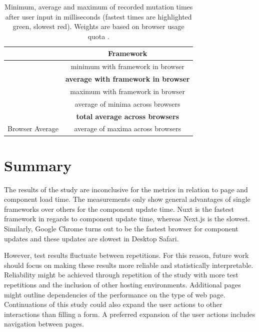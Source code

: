 \documentclass[a4paper, 12pt]{article}
\begin{document}
\begin{table}[h!]
{    \vspace{0.5cm}
      
    {
    
      \begin{tabular}{|l|c|}
        \hline
      ~ & Framework \\ \hline
      \rowcolor{white}                            & minimum with framework in browser \\
      \rowcolor{white}                            & \textbf{average with framework in browser} \\
      \rowcolor{white} \multirow{-3}{*}{Browser}  & maximum with framework in browser \\ \hline \hline
                                                  & average of minima across browsers \\
                                                  & \textbf{total average across browsers} \\
               \multirow{-3}{*}{Browser Average}  & average of maxima across browsers \\ \hline
      \end{tabular}
    }
  \caption{Minimum, average and maximum of recorded mutation times after user input in milliseconds (fastest times are highlighted green, slowest red). Weights are based on browser usage quota \citep{browserUsage}.}
  \label{tab:mutations:times}
  }
\end{table}

\section{Summary}

The results of the study are inconclusive for the metrics in relation to page and component load time.
The measurements only show general advantages of single frameworks over others for the component update time.
Nuxt is the fastest framework in regards to component update time, whereas Next.js is the slowest.
Similarly, Google Chrome turns out to be the fastest browser for component updates and these updates are slowest in Desktop Safari.

However, test results fluctuate between repetitions. For this reason, future work should focus on making these results more reliable and statistically interpretable.
Reliability might be achieved through repetition of the study with more test repetitions and the inclusion of other hosting environments.
Additional pages might outline dependencies of the performance on the type of web page.
Continuations of this study could also expand the user actions to other interactions than filling a form.
A preferred expansion of the user actions includes navigation between pages.
\end{document}
